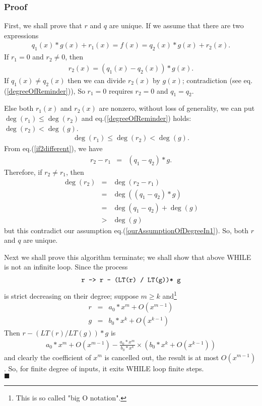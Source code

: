 \documentclass[11pt]{book}
\begin{document}
\subsubsection{Proof}
First, we shall prove that $r$ and $q$ are unique.
If we assume that there are two expressions
\begin{eqnarray}
\label{if2different}
q_1(x)*g(x) + r_1(x) = f(x) = q_2(x)*g(x) + r_2(x).
\end{eqnarray}
If $r_1 = 0$ and $r_2 \neq 0$, then
\begin{eqnarray}
r_2(x) = \left(q_1(x) - q_2(x) \right)*g(x).
\end{eqnarray}
If $q_1(x) \neq q_2(x)$ then we can divide $r_2(x)$ by $g(x)$; contradiction (see eq.(\ref{degreeOfReminder})),
So $r_1 =0$ requires $r_2=0$ and $q_1=q_2$.

Else both $r_1(x)$ and $r_2(x)$ are nonzero, without loss of generality, we can put $\deg(r_1) \leq \deg(r_2)$ and eq.(\ref{degreeOfReminder}) holds: $\deg(r_2)< \deg(g)$.
\begin{eqnarray}
\label{ourAssumptionOfDegreeIn1}
\deg(r_1) \leq \deg(r_2)< \deg(g).
\end{eqnarray}
From eq.(\ref{if2different}), we have
\begin{eqnarray}
r_2 - r_1 &=& (q_1 - q_2)*g.
\end{eqnarray}
Therefore, if $r_2 \neq r_1$, then
\begin{eqnarray}
\deg(r_2) &=& \deg(r_2 - r_1) \\
&=& \deg\left( (q_1 - q_2)*g \right) \\
&=& \deg(q_1 - q_2) + \deg(g) \\
&>& \deg(g)
\end{eqnarray}
but this contradict our assumption eq.(\ref{ourAssumptionOfDegreeIn1}).
So, both $r$ and $q$ are unique.

Next we shall prove this algorithm terminate; we shall show that above WHILE is not an infinite loop.
Since the process
\begin{eqnarray}
\verb| r -> r - (LT(r) / LT(g))* g |
\end{eqnarray}
is strict decreasing on their degree; suppose $m \geq k$ and\footnote{This is so called "big O notation".}
\begin{eqnarray}
r &=& a_0 * x^m + O(x^{m-1}) \\
g &=& b_0 * x^k + O(x^{k-1})
\end{eqnarray}
Then $r - (LT(r) / LT(g))* g$ is
\begin{eqnarray}
a_0 * x^m + O(x^{m-1}) - \frac{a_0 * x^m}{b_0 * x^k} \times \left( b_0 * x^k + O(x^{k-1}) \right)
\end{eqnarray}
and clearly the coefficient of $x^m$ is cancelled out, the result is at most $O(x^{m-1})$.
So, for finite degree of inputs, it exits WHILE loop finite steps.\\
$\blacksquare$
\end{document}

